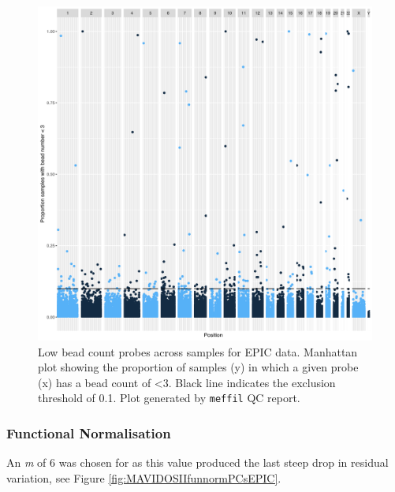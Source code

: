 \documentclass[
]{book}
\begin{document}
\begin{figure}

{\centering \includegraphics[width=0.8\linewidth]{figs/MAVIDOS-II-qcEPICbeadNumAcross} 

}

\caption{Low bead count probes across samples for EPIC data. Manhattan plot showing the proportion of samples (y) in which a given probe (x) has a bead count of \textless3. Black line indicates the exclusion threshold of 0.1. Plot generated by \texttt{meffil} QC report.}\label{fig:MAVIDOSIIqcEPICbeadNumAcross}
\end{figure}



\hypertarget{functional-normalisation-2}{%
\subsubsection{Functional Normalisation}\label{functional-normalisation-2}}

An \emph{m} of 6 was chosen for as this value produced the last steep drop in residual variation, see Figure \ref{fig:MAVIDOSIIfunnormPCsEPIC}.
\end{document}
